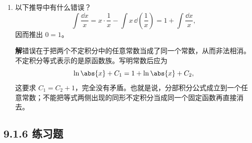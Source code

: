 \begin{enumerate}
\begin{enumerate}[label=(\arabic*)]
    \textbf{解}\quad 不正确。左边是对原函数族中的每个函数取微分所得的微分式，而右边是函数。正确的形式应为
    \[
      \dd\int f(x)\,\dd x=f(x)\,\dd x.
    \]

    \item $\dd\int f(x)\,\dd x=f(x)\,\dd x$；

    \textbf{解}\quad 正确。若 $F'(x)=f(x)$，则
    \[
      \dd(F(x)+C)=F'(x)\,\dd x=f(x)\,\dd x.
    \]

    \item $\int\dd f(x)=f(x)$；

    \textbf{解}\quad 不正确。不定积分表示全部原函数，因此
    \[
      \int\dd f(x)=f(x)+C,
    \]
    不能漏掉任意常数。

    \item $\dd\int\dd f(x)=\dd f(x)$。

    \textbf{解}\quad 正确。因为
    \[
      \int\dd f(x)=f(x)+C,
    \]
    对其中每个函数再取微分都得到 $\dd f(x)$。
  \end{enumerate}

  \item 以下推导中有什么错误？
  \[
    \int\frac{\dd x}{x}
    =x\cdot\frac1x-\int x\,\dd\left(\frac1x\right)
    =1+\int\frac{\dd x}{x},
  \]
  因而推出 $0=1$。

  \textbf{解}\quad 错误在于把两个不定积分中的任意常数当成了同一个常数，从而非法相消。不定积分等式表示的是原函数族。写明常数后应为
  \[
    \ln\abs{x}+C_1
    =1+\ln\abs{x}+C_2,
  \]
  这要求 $C_1=C_2+1$，完全没有矛盾。也就是说，分部积分公式成立到一个任意常数；不能把等式两侧出现的同形不定积分当成同一个固定函数再直接消去。
\end{enumerate}

\subsection*{9.1.6 练习题}

